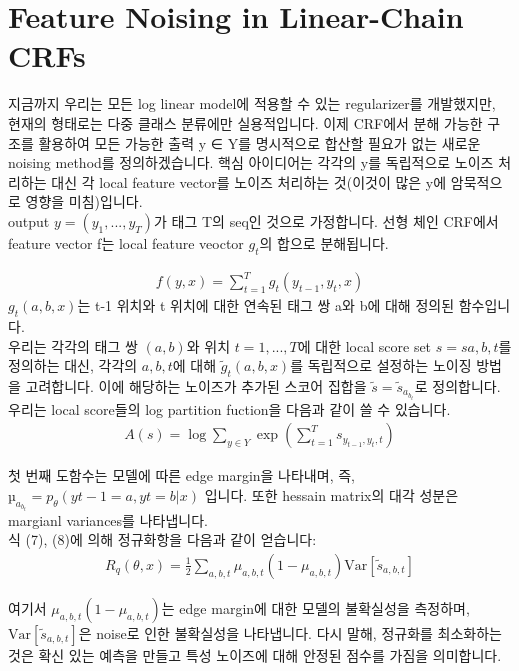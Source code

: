 \documentclass{article}
\begin{document}
\section{Feature Noising in Linear-Chain CRFs}
지금까지 우리는 모든 log linear model에 적용할 수 있는 regularizer를 개발했지만, 현재의 형태로는 다중 클래스 분류에만 실용적입니다. 이제 CRF에서 분해 가능한 구조를 활용하여 모든 가능한 출력 y ∈ Y를 명시적으로 합산할 필요가 없는 새로운 noising method를 정의하겠습니다. 핵심 아이디어는 각각의 y를 독립적으로 노이즈 처리하는 대신 각 local feature vector를 노이즈 처리하는 것(이것이 많은 y에 암묵적으로 영향을 미침)입니다.\\

output $y = (y_1, . . . , y_T )$가 태그 T의 seq인 것으로 가정합니다. 선형 체인 CRF에서 feature vector f는 local feature veoctor $g_t$의 합으로 분해됩니다.

\begin{align}
    f(y, x) = \sum_{t=1}^T g_t(y_{t-1}, y_t, x)
\end{align}
$g_t(a, b, x)$는 t-1 위치와 t 위치에 대한 연속된 태그 쌍 a와 b에 대해 정의된 함수입니다.\\
우리는 각각의 태그 쌍 $(a, b)$와 위치 $t = 1, . . . , T$에 대한 local score set $s = {sa,b,t}$를 정의하는 대신, 각각의 $a, b, t$에 대해 $\tilde{g}_t(a, b, x)$를 독립적으로 설정하는 노이징 방법을 고려합니다. 이에 해당하는 노이즈가 추가된 스코어 집합을 $\tilde{s} = {\tilde{s}_a_b_t}$로 정의합니다.\\
우리는 local score들의 log partition fuction을 다음과 같이 쓸 수 있습니다.
\begin{align}
    A(s) = \log \sum_{y \in Y} \exp \left( \sum_{t=1}^{T} s_{y_{t-1},y_{t},t} \right)
\end{align}

첫 번째 도함수는 모델에 따른 edge margin을 나타내며, 즉, $µ_a_b_t = p_θ(yt−1 = a, yt = b \vert x)$ 입니다. 또한 hessain matrix의 대각 성분은 margianl variances를 나타냅니다.\\
식 (7), (8)에 의해 정규화항을 다음과 같이 얻습니다:
\begin{align}
    R_q(\theta, x) = \frac{1}{2} \sum_{a,b,t} \mu_{a,b,t} (1 - \mu_{a,b,t}) \text{Var}[\tilde{s}_{a,b,t}]
\end{align}

여기서 $\mu_{a,b,t}(1 - \mu_{a,b,t})$는 edge margin에 대한 모델의 불확실성을 측정하며, $\text{Var}[\tilde{s}_{a,b,t}]$은 noise로 인한 불확실성을 나타냅니다. 다시 말해, 정규화를 최소화하는 것은 확신 있는 예측을 만들고 특성 노이즈에 대해 안정된 점수를 가짐을 의미합니다.
\end{document}
